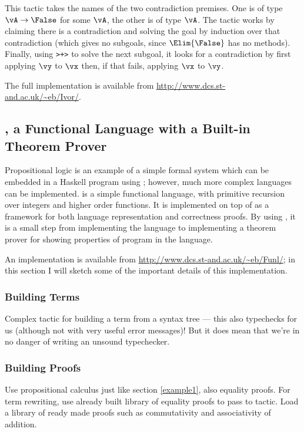 This tactic takes the names of the two contradiction premises. One is
of type $\vA\to\False$ for some $\vA$, the other is of type
$\vA$. The tactic works by claiming there is a contradiction and
solving the goal by induction over that contradiction (which gives no
subgoals, since $\Elim{\False}$ has no methods). Finally, using
\texttt{>+>} to solve the next subgoal, it looks for a contradiction
by first applying $\vy$ to $\vx$ then, if that fails, applying $\vx$
to $\vy$.

The full implementation is available from
\url{http://www.dcs.st-and.ac.uk/~eb/Ivor/}. 

\subsection{\Funl{}, a Functional Language with a Built-in Theorem Prover}

\label{example2}

Propositional logic is an example of a simple formal system which can
be embedded in a Haskell program using \Ivor{}; however, much more
complex languages can be implemented. \Funl{} is a simple functional
language, with primitive recursion over integers and higher order
functions. It is implemented on top of \Ivor{} as a framework for both
language representation and correctness proofs. By using \Ivor{}, it
is a small step from implementing the language to implementing a
theorem prover for showing properties of program in the language.

An implementation is available from
\url{http://www.dcs.st-and.ac.uk/~eb/Funl/}; in this section I will
sketch some of the important details of this implementation.

\subsubsection{Building Terms}

Complex tactic for building a term from a syntax tree --- this also
typechecks for us (although not with very useful error messages)! But
it does mean that we're in no danger of writing an unsound typechecker.

\subsubsection{Building Proofs}

Use propositional calculus just like section \ref{example1}, also
equality proofs. For term rewriting, use already built library of
equality proofs to pass to  tactic. Load a library of
ready made proofs such as commutativity and associativity of addition.

